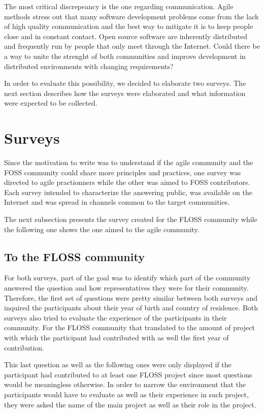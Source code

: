 \documentclass[lnbip]{svmultln}
\begin{document}
The most critical discrepeancy is the one regarding
communication. Agile methods stress out that many software development
problems come from the lack of high quality communication and the best way to mitigate it
is to keep people close and in constant contact. Open source
software are inherently distributed and frequently run by people that
only meet through the Internet. Could there be a way to unite the
strenght of both communities and improve development in distributed
environments with changing requirements?

In order to evaluate this possibility, we decided to elaborate two
surveys. The next section describes how the surveys were elaborated
and what information were expected to be collected.

\section{Surveys}
\label{sec:surveys}

Since the motivation to write was to understand if the agile community
and the FOSS community could share more principles and practices, one
survey was directed to agile practionners while the other was aimed to
FOSS contributors.  Each survey intended to characterize the answering
public, was available on the Internet and was spread in channels
common to the target communities.

The next subsection presents the survey created for the FLOSS
community while the following one shows the one aimed to the agile
community.

\subsection{To the FLOSS community}
\label{subsec:floss-survey}

For both surveys, part of the goal was to identify which part of the
community answered the question and how representatives they were for
their community. Therefore, the first set of questions were pretty
similar between both surveys and inquired the participants about their
year of birth and country of residence. Both surveys also tried to
evaluate the experience of the participants in their community. For
the FLOSS community that translated to the amount of project with
which the participant had contributed with as well the first year of
contribution.

This last question as well as the following ones were only displayed
if the participant had contributed to at least one FLOSS project since
most questions would be meaningless otherwise. In order to narrow the
environment that the participants would have to evaluate as well as
their experience in such project, they were asked the name of the main
project as well as their role in the project.
\end{document}
